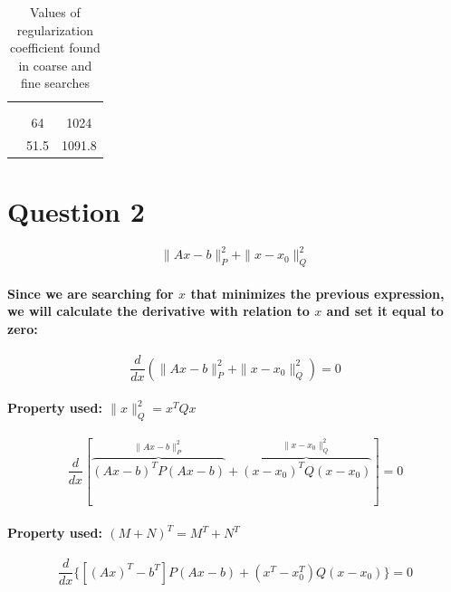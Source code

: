 \documentclass[a4paper]{article}    %
\begin{document}
\begin{table}[H]
    \begin{center}
        \begin{tabular}{r|c|c|} 
            \cline{2-3}
            & \multicolumn{2}{|c|}{\cellcolor[gray]{0.8}{$\lambda$ optimum}} \\
            \cline{2-3}
            & \cellcolor[gray]{0.8}{MSE} & \cellcolor[gray]{0.8}{Accuracy} \\
            \cline{1-3}
            \multicolumn{1}{|r|}{\cellcolor[gray]{0.8}{coarse search}} & 64   & 1024   \\
            \cline{1-3}
            \multicolumn{1}{|r|}{\cellcolor[gray]{0.8}{fine search}}   & 51.5 & 1091.8 \\
            \cline{1-3}
        \end{tabular}
    \end{center}
    \caption{Values of regularization coefficient found in coarse and fine searches}
    \label{tab:alpha_results}
\end{table}

\newpage

\section*{Question 2}

\[\|Ax-b\|_{P}^{2}+\|x-x_{0}\|_{Q}^{2}\]
\paragraph{Since we are searching for $x$ that minimizes the previous expression, we will calculate the derivative with relation to $x$ and set it equal to zero:}
    \[\frac{d}{dx} (\|Ax-b\|_{P}^{2}+\|x-x_{0}\|_{Q}^{2}) = 0\]
\paragraph{Property used: $\|x\|_{Q}^{2} = x^{T}Qx$}
    \[\frac{d}{dx} [\overbrace{(Ax-b)^{T} P (Ax-b)}^{\|Ax-b\|_{P}^{2}} + \overbrace{(x-x_0)^T Q (x-x_0)}^{\|x-x_{0}\|_{Q}^{2}}] = 0\]
\paragraph{Property used: $(M + N)^T = M^T + N^T$}
    \[\frac{d}{dx} \{[(Ax)^T-b^T] P (Ax-b) + (x^T-x_0^T) Q (x-x_0)\} = 0\]
\end{document}
